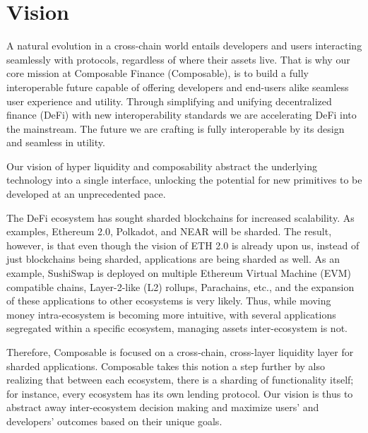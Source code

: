\section{Vision}

A natural evolution in a cross-chain world entails developers and users interacting seamlessly with protocols, regardless of where their assets live. That is why our core mission at Composable Finance (Composable)\cite{ComposableFinance}, is to build a fully interoperable future capable of offering developers and end-users alike seamless user experience and utility. Through simplifying and unifying decentralized finance (DeFi)\cite{DecentralizedEthereum.org} with new interoperability standards we are accelerating DeFi into the mainstream. The future we are crafting is fully interoperable by its design and seamless in utility.

Our vision of hyper liquidity and composability abstract the underlying technology into a single interface, unlocking the potential for new primitives to be developed at an unprecedented pace.

The DeFi ecosystem has sought sharded blockchains for increased scalability.\cite{WhyProperties,WhatCoinDesk} As examples, Ethereum 2.0,\cite{TheEthereum.org} Polkadot,\cite{Polkadot:Platform} and NEAR\cite{NEARWorld} will be sharded. The result, however, is that even though the vision of ETH 2.0 is already upon us, instead of just blockchains being sharded, applications are being sharded as well. As an example, SushiSwap\cite{IntroductionSushi} is deployed on multiple Ethereum Virtual Machine (EVM)\cite{EthereumEthereum.org} compatible chains, Layer-2-like (L2) rollups,\cite{LayerEthereum.org} Parachains,\cite{WhatAlexandria} etc., and the expansion of these applications to other ecosystems is very likely. Thus, while moving money intra-ecosystem is becoming more intuitive, with several applications segregated within a specific ecosystem, managing assets inter-ecosystem is not.\cite{0xbrainjarOurMedium}

Therefore, Composable is focused on a cross-chain, cross-layer liquidity layer for sharded applications. Composable takes this notion a step further by also realizing that between each ecosystem, there is a sharding of functionality itself; for instance, every ecosystem has its own lending protocol. Our vision is thus to abstract away inter-ecosystem decision making and maximize users' and developers' outcomes based on their unique goals.


